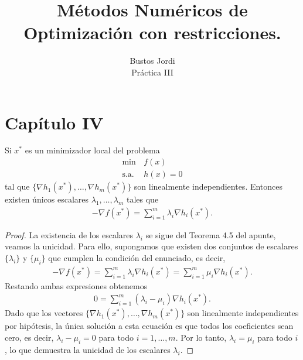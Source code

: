 \documentclass{article}
\newenvironment{theorem}[2][Ejercicio]{\begin{trivlist}
\item[\hskip \labelsep {\bfseries #1}\hskip \labelsep {\bfseries #2.}]}{\end{trivlist}}
\begin{document}
\title{Métodos Numéricos de Optimización con restricciones.}
\author{Bustos Jordi\\Práctica III}

\maketitle

\section*{Capítulo IV}
\begin{theorem}{1}
    Si \( x^* \) es un minimizador local del problema \begin{align*}
        \min \,      & f(x)     \\
        \text{s.a. } & h(x) = 0
    \end{align*}
    tal que \( \{ \nabla h_1(x^*), \ldots, \nabla h_m(x^*)\} \) son linealmente independientes. Entonces
    existen únicos escalares \( \lambda_1, \ldots, \lambda_m \) tales que \begin{align*}
        -\nabla f(x^*) = \sum_{i=1}^{m} \lambda_i \nabla h_i (x^*).
    \end{align*}
\end{theorem}

\begin{proof}
    La existencia de los escalares \( \lambda_i \) se sigue del Teorema 4.5 del apunte, veamos la unicidad.
    Para ello, supongamos que existen dos conjuntos de escalares \( \{ \lambda_i \} \) y \( \{ \mu_i \} \) que cumplen la condición del enunciado, es decir, \begin{align*}
        -\nabla f(x^*) = \sum_{i=1}^{m} \lambda_i \nabla h_i (x^*) = \sum_{i=1}^{m} \mu_i \nabla h_i (x^*).
    \end{align*}
    Restando ambas expresiones obtenemos \begin{align*}
        0 = \sum_{i=1}^{m} (\lambda_i - \mu_i) \nabla h_i (x^*).
    \end{align*}
    Dado que los vectores \( \{ \nabla h_1(x^*), \ldots, \nabla h_m(x^*) \} \) son linealmente independientes por hipótesis, la única solución a esta ecuación es que todos los coeficientes
    sean cero, es decir, \( \lambda_i - \mu_i = 0 \) para todo \( i = 1, \ldots, m \). Por lo tanto, \( \lambda_i = \mu_i \) para todo \( i \), lo que demuestra la unicidad de los escalares \( \lambda_i \).
\end{proof}
\end{document}
